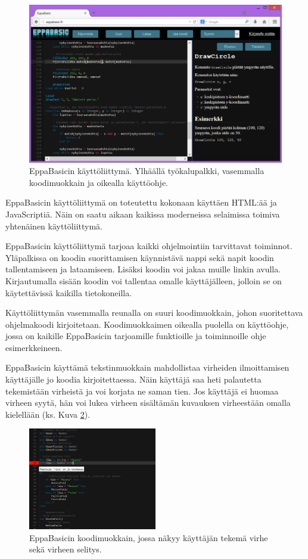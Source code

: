 \begin{figure}[h]
    \centering
    \includegraphics[width=1\textwidth]{kayttoliittyma}
    \caption{EppaBasicin käyttöliittymä. Ylhäällä työkalupalkki, vasemmalla koodimuokkain ja oikealla käyttöohje.}
    \label{img:kayttoliittyma}
\end{figure}

EppaBasicin käyttöliittymä on toteutettu
kokonaan käyttäen HTML:ää ja JavaScriptiä.
Näin on saatu aikaan kaikissa moderneissa
selaimissa toimiva yhtenäinen käyttöliittymä.

EppaBasicin käyttöliittymä tarjoaa kaikki
ohjelmointiin tarvittavat toiminnot.
Yläpalkissa on koodin suorittamisen käynnistävä
nappi sekä napit koodin tallentamiseen ja lataamiseen.
Lisäksi koodin voi jakaa muille linkin avulla.
Kirjautumalla sisään koodin voi tallentaa
omalle käyttäjälleen, jolloin se on käytettävissä
kaikilla tietokoneilla.

Käyttöliittymän vasemmalla reunalla on
suuri koodimuokkain, johon suoritettava
ohjelmakoodi kirjoitetaan.
Koodimuokkaimen oikealla puolella on
käyttöohje, jossa on kaikille
EppaBasicin tarjoamille funktioille
ja toiminnoille ohje esimerkkeineen.

EppaBasicin käyttämä tekstinmuokkain mahdollistaa
virheiden ilmoittamisen käyttäjälle jo
koodia kirjoitettaessa.
Näin käyttäjä saa heti palautetta tekemistään
virheistä ja voi korjata ne saman tien.
Jos käyttäjä ei huomaa virheen syytä,
hän voi lukea virheen sisältämän
kuvauksen virheestään omalla kielellään
(ks. Kuva \ref{img:virhe}).

\begin{figure}[h]
    \centering
    \includegraphics[width=0.5\textwidth]{virhe}
    \caption{EppaBasicin koodimuokkain, jossa näkyy käyttäjän tekemä virhe sekä virheen selitys.}
    \label{img:virhe}
\end{figure}

